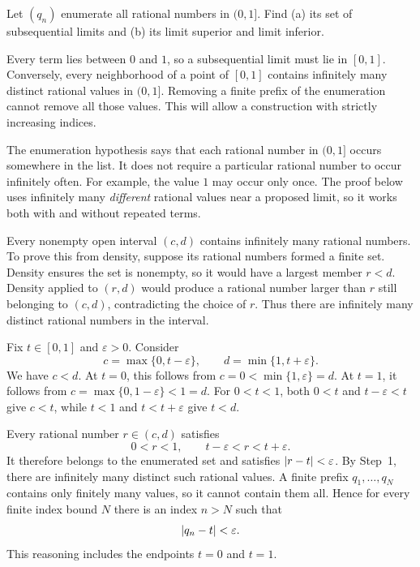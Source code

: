 \goal Let $(q_n)$ enumerate all rational numbers in $(0,1]$.
Find \textup{(a)} its set of subsequential limits and
\textup{(b)} its limit superior and limit inferior.

\idea Every term lies between $0$ and $1$, so a subsequential limit
must lie in $[0,1]$. Conversely, every neighborhood of a point of
$[0,1]$ contains infinitely many distinct rational values in $(0,1]$.
Removing a finite prefix of the enumeration cannot remove all those
values. This will allow a construction with strictly increasing indices.

The enumeration hypothesis says that each rational number in $(0,1]$
occurs somewhere in the list. It does not require a particular rational
number to occur infinitely often. For example, the value $1$ may occur
only once. The proof below uses infinitely many \emph{different}
rational values near a proposed limit, so it works both with and
without repeated terms.

Every nonempty open interval $(c,d)$ contains infinitely many rational
numbers. To prove this from density, suppose its rational numbers
formed a finite set. Density ensures the set is nonempty, so it would
have a largest member $r<d$. Density applied to $(r,d)$ would produce
a rational number larger than $r$ still belonging to $(c,d)$,
contradicting the choice of $r$. Thus there are infinitely many distinct
rational numbers in the interval.

Fix $t\in[0,1]$ and $\varepsilon>0$. Consider
\[
 c=\max\{0,t-\varepsilon\},
 \qquad d=\min\{1,t+\varepsilon\}.
\]
We have $c<d$. At $t=0$, this follows from
$c=0<\min\{1,\varepsilon\}=d$. At $t=1$, it follows from
$c=\max\{0,1-\varepsilon\}<1=d$. For $0<t<1$, both
$0<t$ and $t-\varepsilon<t$ give $c<t$, while
$t<1$ and $t<t+\varepsilon$ give $t<d$.

Every rational number $r\in(c,d)$ satisfies
\[
 0<r<1,
 \qquad t-\varepsilon<r<t+\varepsilon.
\]
It therefore belongs to the enumerated set and satisfies
$\left|r-t\right|<\varepsilon$.
By Step~1, there are infinitely many distinct such rational values.
A finite prefix $q_1,\ldots,q_N$ contains only finitely many values,
so it cannot contain them all. Hence for every finite index bound $N$
there is an index $n>N$ such that
\[
 \left|q_n-t\right|<\varepsilon.
\]
This reasoning includes the endpoints $t=0$ and $t=1$.

